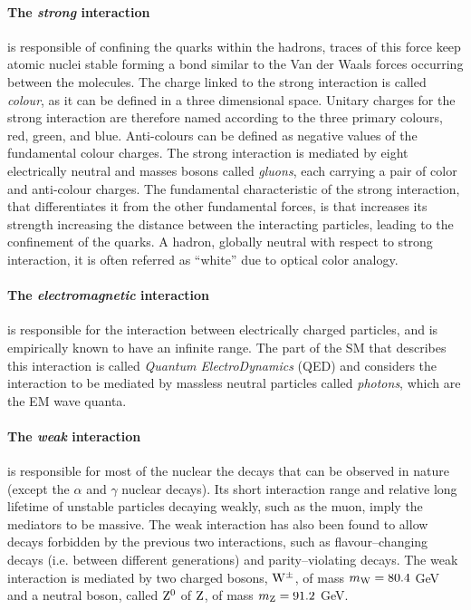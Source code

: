 \paragraph{The \emph{strong} interaction} is responsible of confining the quarks within the hadrons, traces of this force keep atomic nuclei stable forming a bond similar to the Van der Waals forces occurring between the molecules. The charge linked to the strong interaction is called \emph{colour}, as it can be defined in a three dimensional space. Unitary charges for the strong interaction are therefore named according to the three primary colours, red, green, and blue. Anti-colours can be defined as negative values of the fundamental colour charges. The strong interaction is mediated by eight electrically neutral and masses bosons called \emph{gluons}, each carrying a pair of color and anti-colour charges. The fundamental characteristic of the strong interaction, that differentiates it from the other fundamental forces, is that increases its strength increasing the distance between the interacting particles, leading to the confinement of the quarks. A hadron, globally neutral with respect to strong interaction, it is often referred as ``white'' due to optical color analogy.

\paragraph{The \emph{electromagnetic} interaction} is responsible for the interaction between electrically charged particles, and is empirically known to have an infinite range. The part of the SM that describes this interaction is called \emph{Quantum ElectroDynamics} (QED) and considers the interaction to be mediated by massless neutral particles called \emph{photons}, which are the EM wave quanta.

\paragraph{The \emph{weak} interaction} is responsible for most of the nuclear the decays that can be observed in nature (except the $\alpha$ and $\gamma$ nuclear decays). Its short interaction range and relative long lifetime of unstable particles decaying weakly, such as the muon, imply the mediators to be massive. The weak interaction has also been found to allow decays forbidden by the previous two interactions, such as flavour--changing decays (i.e. between different generations) and parity--violating decays. The weak interaction is mediated by two charged bosons, $\mathrm{W}^\pm$, of mass $m_{\mathrm{W}} = 80.4$ GeV and a neutral boson, called $\mathrm{Z}^{0}$ of $\mathrm{Z}$, of mass $m_{\mathrm{Z}} = 91.2$ GeV.

